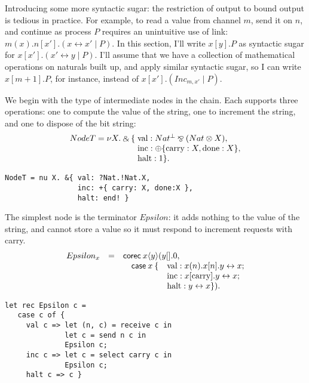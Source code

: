\documentclass[orivec,envcountsame]{llncs}
\newcommand{\with}{\mathbin\binampersand}
\newcommand{\parr}{\mathbin\bindnasrepma}
\newcommand{\cpdual}[1]{#1^\perp}
\newcommand{\mkwd}[1]{\mathsf{#1}}
\newcommand{\link}[2]{#1 \leftrightarrow #2}
\newcommand{\clabel}[1]{\mathrm{#1}}
\newcommand{\sel}[2]{#1[\clabel{#2}]}
\begin{document}
Introducing some more syntactic sugar: the restriction of output to bound output is tedious in
practice.  For example, to read a value from channel $m$, send it on $n$, and continue as process
$P$ requires an unintuitive use of link: $m(x).n[x'].(\link{x}{x'} \mid P)$.  In this section, I'll
write $x[y].P$ as syntactic sugar for $x[x'].(\link{x'}{y} \mid P)$.  I'll assume that we have a
collection of mathematical operations on naturals built up, and apply similar syntactic sugar, so I
can write $x[m + 1].P$, for instance, instead of $x[x'].(Inc_{m,x'} \mid P)$.

We begin with the type of intermediate nodes in the chain.  Each supports three operations: one to
compute the value of the string, one to increment the string, and one to dispose of the bit string:
%
{\small\[\begin{array}{l@{\hspace{1mm}}l}
 NodeT = \nu X. \with \{ &\clabel{val}: \cpdual{Nat} \parr (Nat \otimes X), \\
 & \clabel{inc}: \oplus \{ \clabel{carry}: X, \clabel{done}: X \}, \\
 & \clabel{halt}: 1 \}.
\end{array}\]}

\begin{verbatim}
NodeT = nu X. &{ val: ?Nat.!Nat.X,
                 inc: +{ carry: X, done:X },
                 halt: end! }
\end{verbatim}

The simplest node is the terminator $Epsilon$: it adds nothing to the value of the string, and
cannot store a value so it must respond to increment requests with carry.
%
{\small\[\begin{array}{rcll}
  Epsilon_x & = & \multicolumn{2}{l}{\mkwd{corec}\:x\langle y \rangle ( y[].0,} \\
  & & \quad \mkwd{case}\:x\: \{ &\clabel{val}: x(n).x[n].\link{y}{x}; \\
  & & &\clabel{inc}:\sel{x}{carry}.\link{y}{x}; \\
  & & &\clabel{halt}: \link{y}{x} \}).
\end{array}\]}

\begin{verbatim}
let rec Epsilon c =
   case c of {
     val c => let (n, c) = receive c in
              let c = send n c in
              Epsilon c;
     inc c => let c = select carry c in
              Epsilon c;
     halt c => c }
\end{verbatim}
\end{document}
